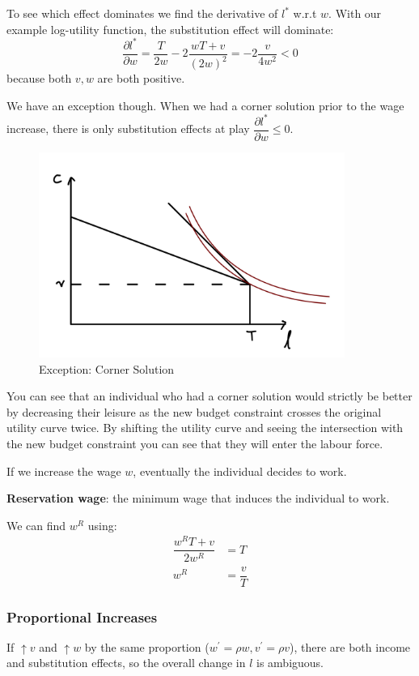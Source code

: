 \documentclass[11pt]{article}
\begin{document}
\begin{example}
To see which effect dominates we find the derivative of $l^*$ w.r.t $w$. With our example log-utility function, the substitution effect will dominate:
    \[\dfrac{\partial l^*}{\partial w} = \dfrac{T}{2w} - 2\dfrac{wT+v}{(2w)^2}= -2\dfrac{v}{4w^2}<0\]
    because both $v,w$ are both positive.
\end{example}

We have an exception though. When we had a corner solution prior to the wage increase, there is only substitution effects at play $\dfrac{\partial l^*}{\partial w}\leq0$.

\begin{figure}[h]
    \centering
    \includegraphics[width=10cm]{photos/corner solution.jpeg}
    \caption{Exception: Corner Solution}
    \label{corner solution}
\end{figure}

You can see that an individual who had a corner solution would strictly be better by decreasing their leisure as the new budget constraint crosses the original utility curve twice. By shifting the utility curve and seeing the intersection with the new budget constraint you can see that they will enter the labour force.

If we increase the wage $w$, eventually the individual decides to work. 
\begin{definition}
\textbf{Reservation wage}: the minimum wage that induces the individual to work.

We can find $w^R$ using:
\begin{align*}
    \dfrac{w^R T + v}{2w^R} &= T \\
    w^R &= \dfrac{v}{T}
\end{align*}
\end{definition}

\subsubsection{Proportional Increases}
If $\uparrow v$ and $\uparrow w$ by the same proportion ($w^\prime = \rho w, v^\prime = \rho v$), there are both income and substitution effects, so the overall change in $l$ is ambiguous.
\end{document}

